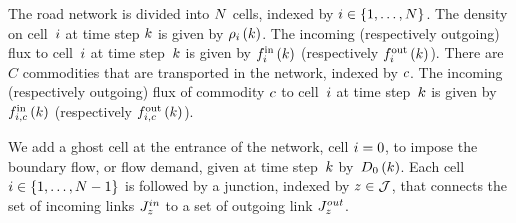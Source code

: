 
The road network is divided into $N$ cells, indexed by $i \in \{1, \dots, N\}$. The density on cell~$i$ at time step $k$ is given by $\rho_{i}\left(k\right)$. The incoming (respectively outgoing) flux to cell~$i$ at time step~$k$ is given by $f_{i}^{\text{in}}\left(k\right)$ (respectively $f_{i}^{\text{out}}\left(k\right)$). There are $C$ commodities that are transported in the network, indexed by $c$. The incoming (respectively outgoing) flux of commodity $c$ to cell~$i$ at time step~$k$ is given by $f_{i,c}^{\text{in}}\left(k\right)$ (respectively $f_{i,c}^{\text{out}}\left(k\right)$).

We add a ghost cell at the entrance of the network, cell $i = 0$, to impose the boundary flow, or flow demand, given at time step~$k$ by~$D_{0}\left(k\right)$. Each cell~$i \in \{1, \dots, N-1\}$ is followed by a junction, indexed by $z \in {\cal J}$, that connects the set of incoming links $J_{z}^{in}$ to a set of outgoing link $J_{z}^{out}$.

